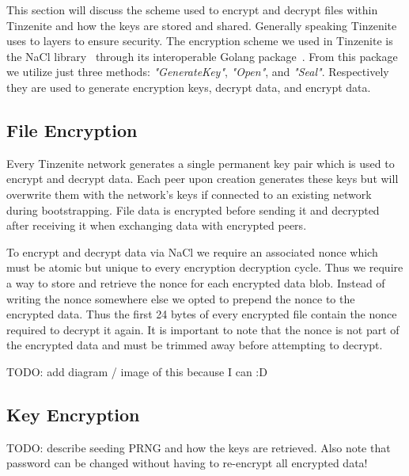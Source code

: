 This section will discuss the scheme used to encrypt and decrypt files within Tinzenite and how the keys are stored and shared.
Generally speaking Tinzenite uses to layers to ensure security.
The encryption scheme we used in Tinzenite is the NaCl library~\cite{bernstein2012security} through its interoperable Golang package~\cite{web:site:golang:box}.%
From this package we utilize just three methods: \textit{"GenerateKey"}, \textit{"Open"}, and \textit{"Seal"}.
Respectively they are used to generate encryption keys, decrypt data, and encrypt data.

\subsection{File Encryption}
\label{sub:File Encryption}

Every Tinzenite network generates a single permanent key pair which is used to encrypt and decrypt data.
Each peer upon creation generates these keys but will overwrite them with the network's keys if connected to an existing network during bootstrapping.
File data is encrypted before sending it and decrypted after receiving it when exchanging data with encrypted peers.

To encrypt and decrypt data via NaCl we require an associated nonce which must be atomic but unique to every encryption decryption cycle.
Thus we require a way to store and retrieve the nonce for each encrypted data blob.
Instead of writing the nonce somewhere else we opted to prepend the nonce to the encrypted data. %
Thus the first 24 bytes of every encrypted file contain the nonce required to decrypt it again.
It is important to note that the nonce is not part of the encrypted data and must be trimmed away before attempting to decrypt.

TODO: add diagram / image of this because I can :D

\subsection{Key Encryption}
\label{sub:Key Encryption}

TODO: describe seeding PRNG and how the keys are retrieved.
Also note that password can be changed without having to re-encrypt all encrypted data!

